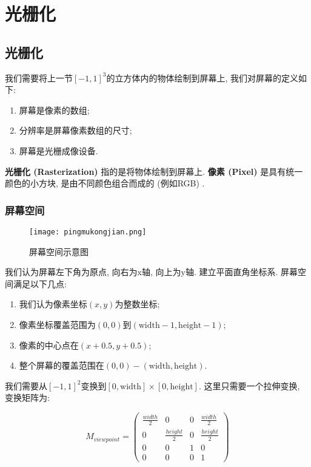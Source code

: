 \part{光栅化}

\chapter{光栅化}

\vspace{\baselineskip}
我们需要将上一节$[-1,1]^3$的立方体内的物体绘制到屏幕上, 我们对屏幕的定义如下: 

\begin{enumerate}[itemsep=-0.5em]
	\item 屏幕是像素的数组; 
	\item 分辨率是屏幕像素数组的尺寸; 
	\item 屏幕是光栅成像设备. 
\end{enumerate}

\textbf{光栅化 (Rasterization) }指的是将物体绘制到屏幕上. \textbf{像素 (Pixel) }是具有统一颜色的小方块, 是由不同颜色组合而成的 (例如RGB) . 

\section{屏幕空间}

\begin{figure}[H]
	\centering
	\texttt{[image: pingmukongjian.png]}
	\caption{屏幕空间示意图}
	\label{fig:projection}
\end{figure}

我们认为屏幕左下角为原点, 向右为x轴, 向上为y轴. 建立平面直角坐标系. 屏幕空间满足以下几点: 

\begin{enumerate}[itemsep=-0.5em]
	\item 我们认为像素坐标$(x,y)$为整数坐标; 
	\item 像素坐标覆盖范围为$(0,0)$到$(\text{width}-1,\text{height}-1)$; 
	\item 像素的中心点在$(x+0.5,y+0.5)$; 
	\item 整个屏幕的覆盖范围在$(0,0)-(\text{width}, \text{height})$.
\end{enumerate}

我们需要从$[-1,1]^2$变换到$[0,\text{width}]\times[0,\text{height}]$. 这里只需要一个拉伸变换, 变换矩阵为: 

\begin{equation}
	M_{viewpoint}=\begin{pmatrix}
		\frac{width}{2} &0&0&\frac{width}{2}\\
		0&\frac{height}{2}&0&\frac{height}{2}\\
		0&0&1&0\\
		0&0&0&1
	\end{pmatrix}
\end{equation}

